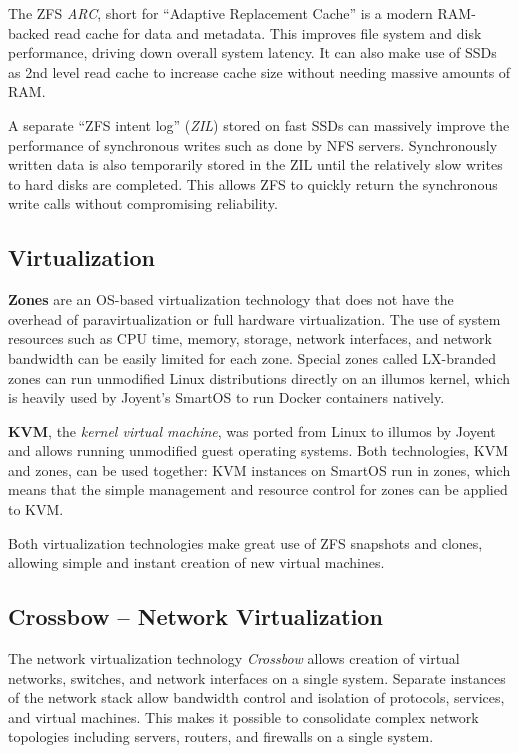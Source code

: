 \documentclass[11pt,foldmark,notumble]{leaflet}
\begin{document}
The ZFS \emph{ARC}, short for ``Adaptive Replacement Cache'' is a
modern RAM-backed read cache for data and metadata. This improves file
system and disk performance, driving down overall system latency. It
can also make use of SSDs as 2nd level read cache to increase cache
size without needing massive amounts of RAM.

A separate ``ZFS intent log'' (\emph{ZIL}) stored on fast SSDs can
massively improve the performance of synchronous writes such as done
by NFS servers. Synchronously written data is also temporarily stored
in the ZIL until the relatively slow writes to hard disks are
completed. This allows ZFS to quickly return the synchronous write
calls without compromising reliability.

\subsection{Virtualization}
\textbf{Zones} are an OS-based virtualization technology that does not
have the overhead of paravirtualization or full hardware virtualization.
The use of system resources such as CPU time, memory, storage, network
interfaces, and network bandwidth can be easily limited for each zone.
Special zones called LX-branded zones can run unmodified Linux
distributions directly on an illumos kernel, which is heavily used by
Joyent's SmartOS to run Docker containers natively.

\textbf{KVM}, the \emph{kernel virtual machine}, was ported from Linux
to illumos by Joyent and allows running unmodified guest operating
systems. Both technologies, KVM and zones, can be used together: KVM
instances on SmartOS run in zones, which means that the simple
management and resource control for zones can be applied to KVM.

Both virtualization technologies make great use of ZFS snapshots and
clones, allowing simple and instant creation of new virtual machines.

\subsection{Crossbow -- Network Virtualization}
The network virtualization technology \emph{Crossbow} allows creation
of virtual networks, switches, and network interfaces on a single
system. Separate instances of the network stack allow bandwidth
control and isolation of protocols, services, and virtual machines.
This makes it possible to consolidate complex network topologies
including servers, routers, and firewalls on a single system.
\end{document}
